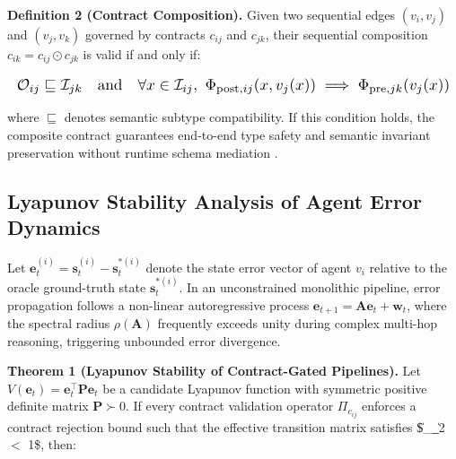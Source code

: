 \documentclass[10pt,twocolumn,letterpaper]{article}
\begin{document}
\textbf{Definition 2 (Contract Composition).} Given two sequential edges $(v_i, v_j)$ and $(v_j, v_k)$ governed by contracts $c_{ij}$ and $c_{jk}$, their sequential composition $c_{ik} = c_{ij} \odot c_{jk}$ is valid if and only if:

















\begin{equation}
\resizebox{\columnwidth}{!}{$\displaystyle
\begin{aligned}
\mathcal{O}_{ij} \sqsubseteq \mathcal{I}_{jk} \quad \text{and} \quad \forall x \in \mathcal{I}_{ij},\ \Phi_{\text{post}, ij}(x, v_j(x)) \implies \Phi_{\text{pre}, jk}(v_j(x))
\end{aligned}
$}
\end{equation}

















where $\sqsubseteq$ denotes semantic subtype compatibility. If this condition holds, the composite contract guarantees end-to-end type safety and semantic invariant preservation without runtime schema mediation \cite{crossref_10_18653_v1_2026_findings_acl_1933}.


\subsection{Lyapunov Stability Analysis of Agent Error Dynamics}


Let $\mathbf{e}_t^{(i)} = \mathbf{s}_t^{(i)} - \mathbf{s}_t^{*(i)}$ denote the state error vector of agent $v_i$ relative to the oracle ground-truth state $\mathbf{s}_t^{*(i)}$. In an unconstrained monolithic pipeline, error propagation follows a non-linear autoregressive process $\mathbf{e}_{t+1} = \mathbf{A}\mathbf{e}_t + \mathbf{w}_t$, where the spectral radius $\rho(\mathbf{A})$ frequently exceeds unity during complex multi-hop reasoning, triggering unbounded error divergence.

\textbf{Theorem 1 (Lyapunov Stability of Contract-Gated Pipelines).} Let $V(\mathbf{e}_t) = \mathbf{e}_t^\top \mathbf{P} \mathbf{e}_t$ be a candidate Lyapunov function with symmetric positive definite matrix $\mathbf{P} \succ 0$. If every contract validation operator $\Pi_{c_{ij}}$ enforces a contract rejection bound such that the effective transition matrix satisfies \$\|\_{}\|\_2 \le \rho $<$ 1\$, then:
\end{document}
